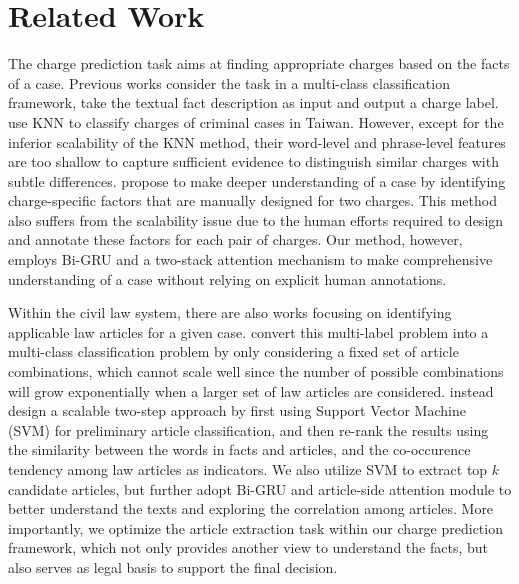 \section{Related Work}
\label{sec_related_work}
The charge prediction task aims at finding appropriate charges based on the facts of a case. Previous works consider the task in a multi-class classification framework, take the textual fact description as input and output a charge label. 
\cite{LIU2004case,liu2006exploring} use KNN to classify charges of criminal cases in Taiwan. However, except for the inferior scalability of the KNN method, their word-level and phrase-level features are too shallow to capture  sufficient evidence to distinguish similar charges with subtle differences. 
\cite{lin2012exploiting} propose to make deeper understanding of a case by identifying charge-specific factors that are manually designed for two charges. This method also suffers from the scalability issue due to the human efforts required to design and annotate these factors for each pair of charges. Our method, however, employs Bi-GRU and a two-stack attention mechanism to make comprehensive understanding of a case without relying on explicit human annotations. 

Within the civil law system,
there are also works focusing on identifying applicable law articles for a given case. 
\cite{liu2005classifying,liu2006exploring} convert this multi-label problem into a multi-class classification problem by only considering a fixed set of article combinations, which cannot scale well since the number of possible combinations will grow exponentially when a larger set of 
law articles are considered.
\cite{liu2015predicting} instead design a scalable two-step approach %
by first using Support Vector Machine (SVM) for preliminary article classification, and then 
re-rank the results using the similarity between the words in facts and articles, and the co-occurence tendency among law articles as indicators.
We also utilize SVM to extract top $k$ candidate articles, but further adopt Bi-GRU and article-side attention module to better understand the texts and exploring the correlation among articles. 
More importantly, we optimize the article extraction task within our charge prediction framework,  which not only provides another view to understand the facts, but also serves as legal basis to support the final decision.


